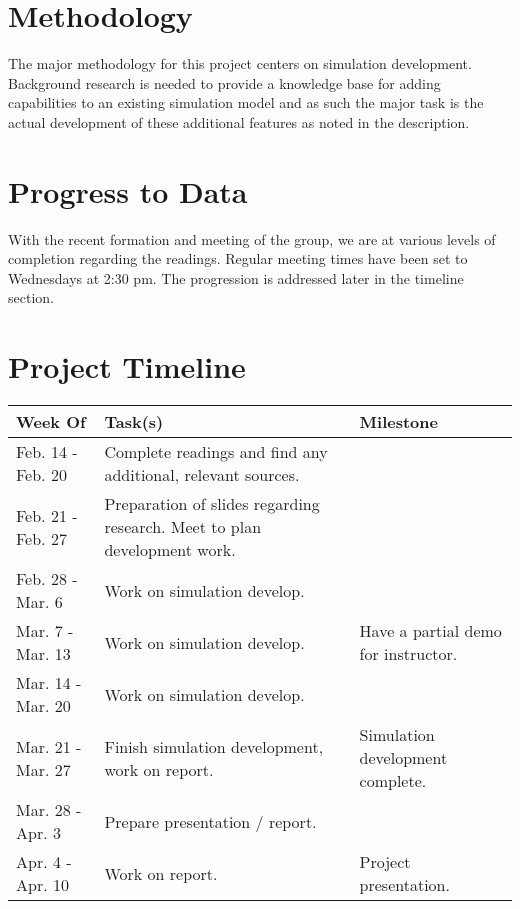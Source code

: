 \documentclass{article}
\begin{document}
\section{Methodology}

The major methodology for this project centers on simulation
development. Background research is needed to provide a knowledge base
for adding capabilities to an existing simulation model and as such
the major task is the actual development of these additional features
as noted in the description.

\section{Progress to Data}

With the recent formation and meeting of the group, we are at various
levels of completion regarding the readings. Regular meeting times
have been set to Wednesdays at 2:30 pm. The progression is addressed
later in the timeline section.

\section{Project Timeline}

\begin{center}
  \begin{tabular}{l|p{8cm}|p{3cm}}
    Week Of & Task(s) & Milestone \\
    \hline
    Feb. 14 - Feb. 20 & Complete readings and find any additional, relevant sources. & \\
    Feb. 21 - Feb. 27 & Preparation of slides regarding research. Meet to plan development work. & \\
    Feb. 28 - Mar. 6 & Work on simulation develop. & \\
    Mar. 7 - Mar. 13 & Work on simulation develop. & Have a partial demo for instructor. \\
    Mar. 14 - Mar. 20 & Work on simulation develop. & \\
    Mar. 21 - Mar. 27 & Finish simulation development, work on report. & Simulation development complete. \\
    Mar. 28 - Apr. 3 & Prepare presentation / report. & \\
    Apr. 4 - Apr. 10 & Work on report. & Project presentation. \\
  \end{tabular}
\end{center}
\end{document}
